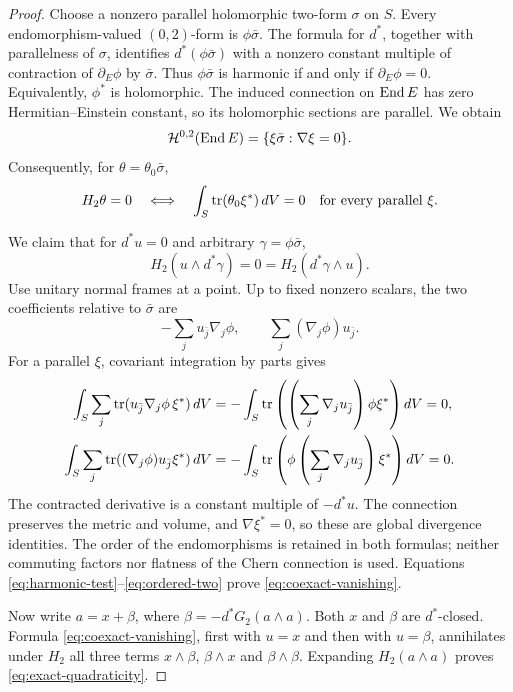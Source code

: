 \begin{proof}
Choose a nonzero parallel holomorphic two-form $\sigma$ on $S$.
Every endomorphism-valued $(0,2)$-form is $\phi\bar\sigma$.
The formula for $d^*$, together with parallelness of $\sigma$,
identifies $d^*(\phi\bar\sigma)$ with a nonzero constant
multiple of contraction of $\partial_E\phi$ by $\bar\sigma$.
Thus $\phi\bar\sigma$ is harmonic if and only if
$\partial_E\phi=0$. Equivalently, $\phi^*$ is holomorphic.
The induced connection on $\operatorname{End} E$ has zero Hermitian--Einstein
constant, so its holomorphic sections are parallel. We obtain
\begin{equation}\label{eq:harmonic-two}
 \mathcal H^{0,2}(\operatorname{End} E)
   =\{\xi\bar\sigma:\nabla\xi=0\}.
\end{equation}
Consequently, for $\theta=\theta_0\bar\sigma$,
\begin{equation}\label{eq:harmonic-test}
 H_2\theta=0\quad\Longleftrightarrow\quad
 \int_S\operatorname{tr}(\theta_0\xi^*)\,dV=0
 \quad\hbox{for every parallel }\xi.
\end{equation}

We claim that for $d^*u=0$ and arbitrary
$\gamma=\phi\bar\sigma$,
\begin{equation}\label{eq:coexact-vanishing}
 H_2(u\wedge d^*\gamma)=0
      =H_2(d^*\gamma\wedge u).
\end{equation}
Use unitary normal frames at a point. Up to fixed nonzero
scalars, the two coefficients relative to $\bar\sigma$ are
\[
 -\sum_j u_{\bar j}\nabla_j\phi,
 \qquad \sum_j(\nabla_j\phi)u_{\bar j}.
\]
For a parallel $\xi$, covariant integration by parts gives
\begin{align}
 \int_S\sum_j\operatorname{tr}(u_{\bar j}\nabla_j\phi\,\xi^*)\,dV
 &=-\int_S\operatorname{tr}\left(\left(\sum_j\nabla_j u_{\bar j}\right)
                   \phi\xi^*\right)dV=0,\label{eq:ordered-one}\\
 \int_S\sum_j\operatorname{tr}((\nabla_j\phi)u_{\bar j}\xi^*)\,dV
 &=-\int_S\operatorname{tr}\left(\phi\left(\sum_j\nabla_j u_{\bar j}\right)
                   \xi^*\right)dV=0.\label{eq:ordered-two}
\end{align}
The contracted derivative is a constant multiple of $-d^*u$.
The connection preserves the metric and volume, and
$\nabla\xi^*=0$, so these are global divergence identities.
The order of the endomorphisms is retained in both formulas;
neither commuting factors nor flatness of the Chern connection
is used. Equations \eqref{eq:harmonic-test}--\eqref{eq:ordered-two}
prove \eqref{eq:coexact-vanishing}.

Now write $a=x+\beta$, where
$\beta=-d^*G_2(a\wedge a)$. Both $x$ and $\beta$ are
$d^*$-closed. Formula \eqref{eq:coexact-vanishing}, first with
$u=x$ and then with $u=\beta$, annihilates under $H_2$ all
three terms $x\wedge\beta$, $\beta\wedge x$ and
$\beta\wedge\beta$. Expanding $H_2(a\wedge a)$ proves
\eqref{eq:exact-quadraticity}.
\end{proof}

